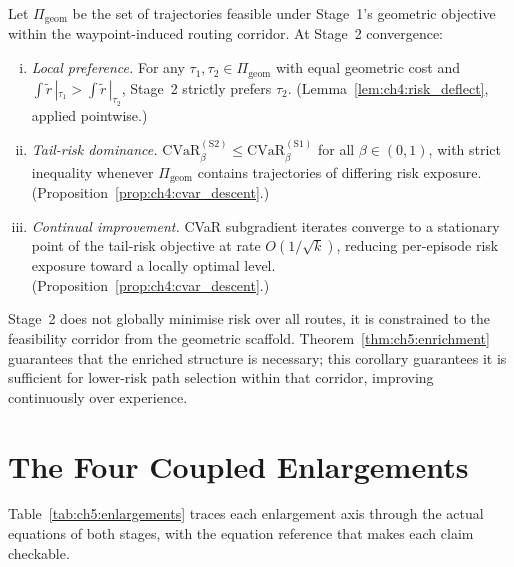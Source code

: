 \begin{corollary}
\label{cor:ch5:risk_selection}
Let $\Pi_{\mathrm{geom}}$ be the set of trajectories feasible under
Stage~1's geometric objective within the waypoint-induced routing
corridor.
At Stage~2 convergence:
\begin{enumerate}[(i)]
  \item \emph{Local preference.}
    For any $\tau_1,\tau_2\in\Pi_{\mathrm{geom}}$ with equal geometric
    cost and $\int\tilde{r}\,|_{\tau_1}>\int\tilde{r}\,|_{\tau_2}$,
    Stage~2 strictly prefers $\tau_2$.
    (Lemma~\ref{lem:ch4:risk_deflect}, applied pointwise.)
  \item \emph{Tail-risk dominance.}
    $\mathrm{CVaR}_\beta^{(\mathrm{S2})}
     \leq\mathrm{CVaR}_\beta^{(\mathrm{S1})}$
    for all $\beta\in(0,1)$, with strict inequality whenever
    $\Pi_{\mathrm{geom}}$ contains trajectories of differing risk
    exposure.
    (Proposition~\ref{prop:ch4:cvar_descent}.)
  \item \emph{Continual improvement.}
    CVaR subgradient iterates converge to a stationary point of the
    tail-risk objective at rate $O(1/\sqrt{k})$,
    reducing per-episode risk exposure toward a locally optimal level.
    (Proposition~\ref{prop:ch4:cvar_descent}.)
\end{enumerate}
Stage~2 does not globally minimise risk over all routes, it is
constrained to the feasibility corridor from the geometric scaffold.
Theorem~\ref{thm:ch5:enrichment} guarantees that the enriched structure
is necessary; this corollary guarantees it is sufficient for
lower-risk path selection within that corridor, improving continuously
over experience.
\end{corollary}

\section{The Four Coupled Enlargements}
\label{sec:ch5:four}

Table~\ref{tab:ch5:enlargements} traces each enlargement axis through
the actual equations of both stages, with the equation reference that
makes each claim checkable.


